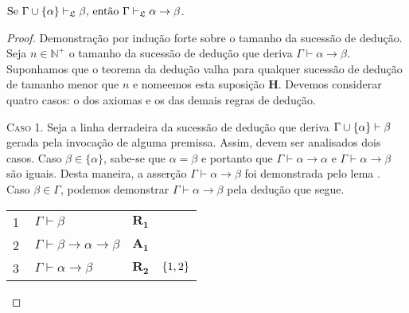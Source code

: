     \vspace{\baselineskip}
    \begin{tcolorbox}[enhanced jigsaw, breakable, sharp corners, colframe=black, colback=white, boxrule=0.5pt, left=1.5mm, right=1.5mm, top=1.5mm, bottom=1.5mm]
        \begin{theorem}[Dedução]\label{deduction}
            $\text{Se }\Gamma\cup\left\{\alpha\right\}\vdash_{\mathfrak{L}}\beta\text{, então }\Gamma\vdash_{\mathfrak{L}}\alpha\to\beta$.
        \begin{proof}
        Demonstração por indução forte sobre o tamanho da sucessão de dedução.
        Seja $n\in\mathbb{N}^+$ o tamanho da sucessão de dedução que deriva $\Gamma\vdash\alpha\to\beta$.
        Suponhamos que o teorema da dedução valha para qualquer sucessão de dedução de tamanho menor que $n$ e nomeemos esta suposição $\mathbf{H}$.
        Devemos considerar quatro casos: o dos axiomas e os das demais regras de dedução.
        
        \begin{case}
        \vspace{\baselineskip}
        \textsc{Caso 1.}
        Seja a linha derradeira da sucessão de dedução que deriva $\Gamma\cup\left\{\alpha\right\}\vdash\beta$ gerada pela invocação de alguma premissa.
        Assim, devem ser analisados dois casos.
        Caso $\beta\in\{\alpha\}$, sabe-se que $\alpha=\beta$ e portanto que $\Gamma\vdash\alpha\to\alpha$ e $\Gamma\vdash\alpha\to\beta$ são iguais.
        Desta maneira, a asserção $\Gamma\vdash\alpha\to\beta$ foi demonstrada pelo lema .
        Caso $\beta\in\Gamma$, podemos demonstrar $\Gamma\vdash\alpha\to\beta$ pela dedução que segue.

        \vspace{0.5\baselineskip}
        \footnotesize
        \setlength{\rowskip}{0.5\baselineskip}
        \begin{xltabular}{\textwidth}{r | X l l}
            \scriptsize{\phantom{0}1}\phantom{ } & $\ \Gamma\vdash\beta$                  & \hyperref[modal.rule.1]{$\mathbf{R_1}$}\phantom{1} & \\[\rowskip]
            \scriptsize{\phantom{0}2}\phantom{ } & $\ \Gamma\vdash\beta\to\alpha\to\beta$ & \hyperref[modal.axiom.1]{$\mathbf{A_1}$}           & \\[\rowskip]
            \scriptsize{\phantom{0}3}\phantom{ } & $\ \Gamma\vdash\alpha\to\beta$         & $\hyperref[modal.rule.2]{\mathbf{R_2}}$            & $\left\{1,2\right\}$
        \end{xltabular}
        \normalsize
        \end{case}


\end{proof}
\end{theorem}
\end{tcolorbox}
